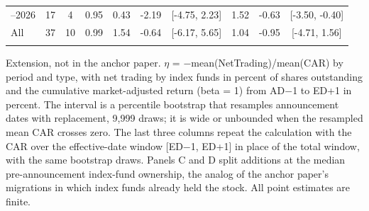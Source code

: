 \begin{threeparttable}
\begin{tabular}{@{}lccccccccc}
\addlinespace[0.25ex]
\addlinespace[0.25ex]
2022–2026 & 17 & 4 & 0.95 & 0.43 & -2.19 & [-4.75, 2.23] & 1.52 & -0.63 & [-3.50, -0.40] \\
\addlinespace[0.25ex]
\addlinespace[0.25ex]
All & 37 & 10 & 0.99 & 1.54 & -0.64 & [-6.17, 5.65] & 1.04 & -0.95 & [-4.71, 1.56] \\
\addlinespace[0.25ex]
\bottomrule
\end{tabular}
\endgroup
\noindent\begin{minipage}{\linewidth}\smallskip\footnotesize
Extension, not in the anchor paper. $\eta$ = $-$mean(NetTrading)/mean(CAR) by period and type, with net trading by index funds in percent of shares outstanding and the cumulative market-adjusted return (beta = 1) from AD$-$1 to ED+1 in percent. The interval is a percentile bootstrap that resamples announcement dates with replacement, 9,999 draws; it is wide or unbounded when the resampled mean CAR crosses zero. The last three columns repeat the calculation with the CAR over the effective-date window [ED$-$1, ED+1] in place of the total window, with the same bootstrap draws. Panels C and D split additions at the median pre-announcement index-fund ownership, the analog of the anchor paper's migrations in which index funds already held the stock. All point estimates are finite.\end{minipage}

\end{threeparttable}